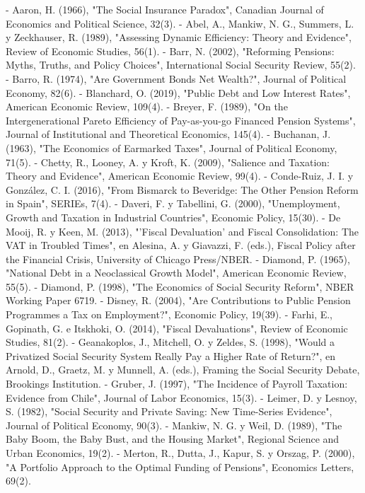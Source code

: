 \documentclass[10pt,a4paper]{article}
\begin{document}
- Aaron, H. (1966), "The Social Insurance Paradox", Canadian Journal of Economics and Political Science, 32(3).
- Abel, A., Mankiw, N. G., Summers, L. y Zeckhauser, R. (1989), "Assessing Dynamic Efficiency: Theory and Evidence", Review of Economic Studies, 56(1).
- Barr, N. (2002), "Reforming Pensions: Myths, Truths, and Policy Choices", International Social Security Review, 55(2).
- Barro, R. (1974), "Are Government Bonds Net Wealth?", Journal of Political Economy, 82(6).
- Blanchard, O. (2019), "Public Debt and Low Interest Rates", American Economic Review, 109(4).
- Breyer, F. (1989), "On the Intergenerational Pareto Efficiency of Pay-as-you-go Financed Pension Systems", Journal of Institutional and Theoretical Economics, 145(4).
- Buchanan, J. (1963), "The Economics of Earmarked Taxes", Journal of Political Economy, 71(5).
- Chetty, R., Looney, A. y Kroft, K. (2009), "Salience and Taxation: Theory and Evidence", American Economic Review, 99(4).
- Conde-Ruiz, J. I. y González, C. I. (2016), "From Bismarck to Beveridge: The Other Pension Reform in Spain", SERIEs, 7(4).
- Daveri, F. y Tabellini, G. (2000), "Unemployment, Growth and Taxation in Industrial Countries", Economic Policy, 15(30).
- De Mooij, R. y Keen, M. (2013), "'Fiscal Devaluation' and Fiscal Consolidation: The VAT in Troubled Times", en Alesina, A. y Giavazzi, F. (eds.), Fiscal Policy after the Financial Crisis, University of Chicago Press/NBER.
- Diamond, P. (1965), "National Debt in a Neoclassical Growth Model", American Economic Review, 55(5).
- Diamond, P. (1998), "The Economics of Social Security Reform", NBER Working Paper 6719.
- Disney, R. (2004), "Are Contributions to Public Pension Programmes a Tax on Employment?", Economic Policy, 19(39).
- Farhi, E., Gopinath, G. e Itskhoki, O. (2014), "Fiscal Devaluations", Review of Economic Studies, 81(2).
- Geanakoplos, J., Mitchell, O. y Zeldes, S. (1998), "Would a Privatized Social Security System Really Pay a Higher Rate of Return?", en Arnold, D., Graetz, M. y Munnell, A. (eds.), Framing the Social Security Debate, Brookings Institution.
- Gruber, J. (1997), "The Incidence of Payroll Taxation: Evidence from Chile", Journal of Labor Economics, 15(3).
- Leimer, D. y Lesnoy, S. (1982), "Social Security and Private Saving: New Time-Series Evidence", Journal of Political Economy, 90(3).
- Mankiw, N. G. y Weil, D. (1989), "The Baby Boom, the Baby Bust, and the Housing Market", Regional Science and Urban Economics, 19(2).
- Merton, R., Dutta, J., Kapur, S. y Orszag, P. (2000), "A Portfolio Approach to the Optimal Funding of Pensions", Economics Letters, 69(2).
\end{document}
